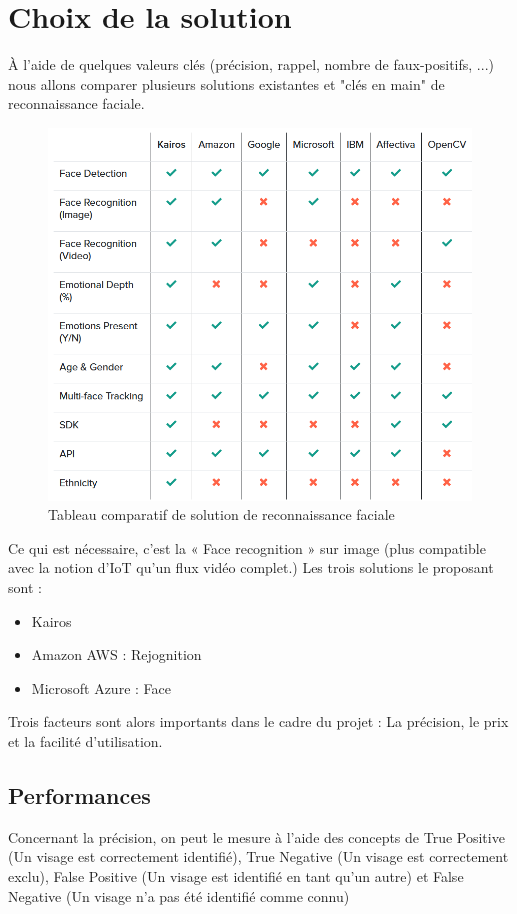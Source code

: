 \section{Choix de la solution}

À l'aide de quelques valeurs clés (précision, rappel, nombre de faux-positifs, ...) nous allons comparer plusieurs solutions existantes et "clés en main" de reconnaissance faciale.

\begin{figure}[H]
	\centering
	\includegraphics[width=12cm]{images/proto-4.png}
	\caption{Tableau comparatif de solution de reconnaissance faciale}
	\label{fig:tab-comparatif-reco}
\end{figure}

Ce qui est nécessaire, c’est la « Face recognition » sur image (plus compatible avec la notion d’IoT qu’un flux vidéo
complet.) Les trois solutions le proposant sont :

\begin{itemize}
\item Kairos
\item Amazon AWS : Rejognition
\item Microsoft Azure : Face
\end{itemize}

Trois facteurs sont alors importants dans le cadre du projet : La précision, le prix et la facilité d’utilisation.

\subsection{Performances}
Concernant la précision, on peut le mesure à l’aide des concepts de True Positive (Un visage est correctement
identifié), True Negative (Un visage est correctement exclu), False Positive (Un visage est identifié en tant qu’un
autre) et False Negative (Un visage n’a pas été identifié comme connu)

